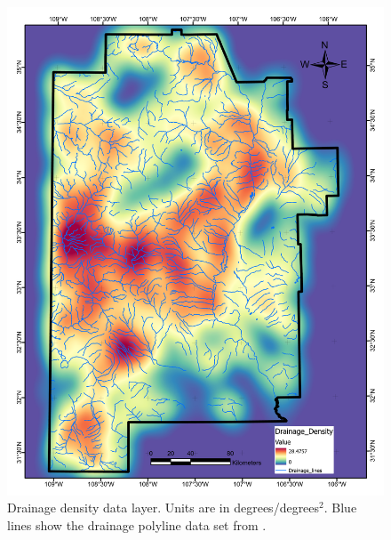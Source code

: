 \begin{figure}[!htp]
\centering
\includegraphics[scale=.50]{templates/images/Figure-DrainageDensity.pdf}
\caption[Drainage density data layer]{Drainage density data layer. Units are in degrees/degrees$^2$. Blue lines show the drainage polyline data set from \protect\citep{bielicki_hydrogeolgic_2015}.}
\label{fig:feat_drainage}
\end{figure}

